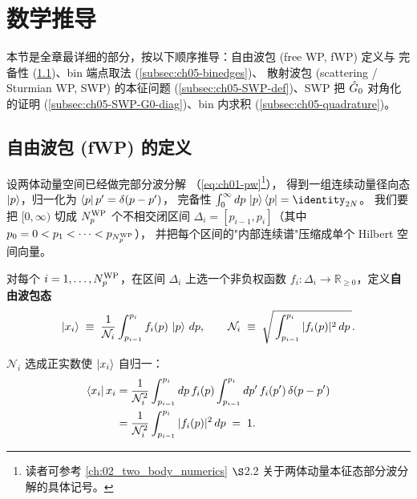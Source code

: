 \section{数学推导}
\label{sec:ch05-math}

本节是全章最详细的部分，按以下顺序推导：自由波包 (free WP, fWP) 定义与
完备性 (\cref{subsec:ch05-fWP-def})、bin 端点取法 (\cref{subsec:ch05-binedges})、
散射波包 (scattering / Sturmian WP, SWP) 的本征问题
(\cref{subsec:ch05-SWP-def})、SWP 把 \(\hat{G}_0\) 对角化的证明
(\cref{subsec:ch05-SWP-G0-diag})、bin 内求积 (\cref{subsec:ch05-quadrature})。

\subsection{自由波包 (fWP) 的定义}
\label{subsec:ch05-fWP-def}

设两体动量空间已经做完部分波分解
（\cref{eq:ch01-pw}\footnote{读者可参考 \cref{ch:02_two_body_numerics}
\(\S\)2.2 关于两体动量本征态部分波分解的具体记号。}），
得到一组连续动量径向态 \(\ket{p}\)，归一化为
\(\bra{p}{p'} = \delta(p - p')\)，
完备性 \(\int_0^\infty dp\,\ket{p}\bra{p} = \identity_{2N}\)。
我们要把 \([0, \infty)\) 切成 \({N_{p}^{\text{WP}}}\) 个不相交闭区间
\(\Delta_i = [p_{i-1}, p_i]\)（其中 \(p_0 = 0 < p_1 < \cdots < p_{{N_{p}^{\text{WP}}}}\)），
并把每个区间的"内部连续谱"压缩成单个 Hilbert 空间向量。

\begin{definition}
\label{def:ch05-fWP}
对每个 \(i = 1, \ldots, {N_{p}^{\text{WP}}}\)，在区间 \(\Delta_i\) 上选一个非负权函数
\(f_i: \Delta_i \to \mathbb{R}_{\ge 0}\)，定义\textbf{自由波包态}
\begin{equation}
\label{eq:ch05-fWP-def}
\ket{x_{i}}
\;\equiv\;
\frac{1}{\mathcal{N}_i}
\int_{p_{i-1}}^{p_i} f_i(p)\,\ket{p}\,dp,
\qquad
\mathcal{N}_i
\;\equiv\;
\sqrt{\,\int_{p_{i-1}}^{p_i} |f_i(p)|^2\,dp\,}.
\end{equation}
\end{definition}

\(\mathcal{N}_i\) 选成正实数使 \(\ket{x_{i}}\) 自归一：
\begin{align}
\bra{x_i}{x_i}
&= \frac{1}{\mathcal{N}_i^2}
   \int_{p_{i-1}}^{p_i} dp\, f_i(p)
   \int_{p_{i-1}}^{p_i} dp'\, f_i(p')\,
   \delta(p - p') \nonumber\\
&= \frac{1}{\mathcal{N}_i^2}
   \int_{p_{i-1}}^{p_i} |f_i(p)|^2\,dp
\;=\; 1.
\label{eq:ch05-fWP-norm}
\end{align}


